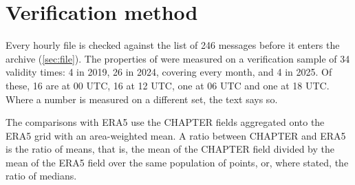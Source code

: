 \chapter{Verification method}
\label{app:verifica}

Every hourly file is checked against the list of 246 messages before it enters the archive
(\cref{sec:file}). The properties of  were measured on a
verification sample of 34 validity times: 4 in 2019, 26 in 2024, covering every month, and 4 in
2025. Of these, 16 are at 00 UTC, 16 at 12 UTC, one at 06 UTC and one at 18 UTC. Where a number is
measured on a different set, the text says so.

The comparisons with ERA5 use the CHAPTER fields aggregated onto the ERA5 grid with an area-weighted
mean. A ratio between CHAPTER and ERA5 is the ratio of means, that is, the mean of the CHAPTER field
divided by the mean of the ERA5 field over the same population of points, or, where stated, the
ratio of medians.
